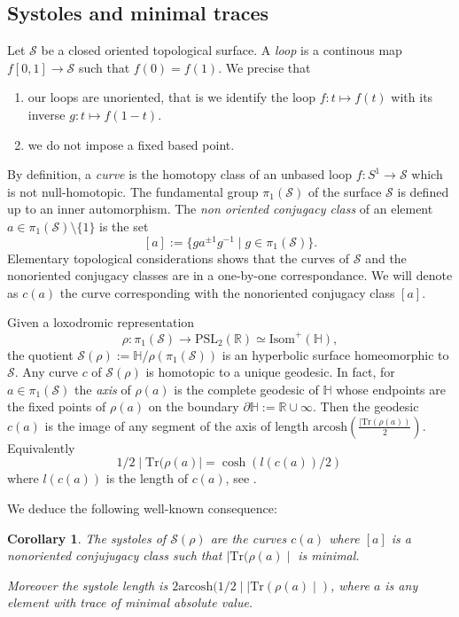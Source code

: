 \documentclass[12pt]{amsart}
\newcommand{\HP}{\mathbb{H}}
\newcommand{\R}{\mathbb{R}}
\newcommand{\arcosh}{\mathrm{arcosh}}
\newcommand{\Isom}{\mathrm{Isom}}
\newcommand{\PSL}{{\mathrm {PSL}}}
\newcommand{\Tr}{{\mathrm {Tr}}}
\newtheorem{cor}[lemma]{Corollary}
\newcommand{\cS}{\mathcal{S}}
\begin{document}
\subsection{Systoles and minimal traces}

Let $\cS$ be a closed oriented topological surface.
A {\it loop} is a continous map 
$f[0,1]\to{\cS}$ such that $f(0)=f(1)$.
We precise that
\begin{enumerate}
\item[(a)] our loops are unoriented, that is
we identify the loop
$f:t\mapsto f(t)$ with its inverse
$g: t\mapsto f(1-t)$. 
\item[(b)] we do not impose a fixed based point.
\end{enumerate}

By definition, a {\it curve} is the homotopy class
of an unbased loop $f:S^1\to {\cS}$ which is not null-homotopic.
The fundamental group $\pi_1(\cS)$  of the surface 
$\cS$ is defined up to an inner automorphism. The {\it non oriented conjugacy class}
of an element $a\in \pi_1(\cS)\setminus\{1\}$ is the set
$$[a]:=\{ga^{\pm 1}g^{-1}\mid g\in \pi_1(\cS)\}.$$
Elementary topological considerations shows
that the curves of $\cS$ and the nonoriented conjugacy classes are in a one-by-one correspondance. We will
denote as $c(a)$ the curve corresponding with the nonoriented conjugacy class $[a]$.

Given a loxodromic representation
$$\rho:\pi_1(\cS)\to\PSL_2(\R)\simeq \Isom^+(\HP),$$
the quotient $\cS(\rho):= \HP/\rho(\pi_1(\cS))$ is an hyperbolic surface homeomorphic to
$\cS$. Any curve $c$ of $\cS(\rho)$
is homotopic to a unique geodesic. 
In fact, for  $a\in \pi_1(\cS)$ the {\it axis}  of $\rho(a)$ is the complete geodesic of $\HP$  whose  endpoints are the fixed points of  
$\rho(a)$ on the boundary $\partial \HP:=\R\cup{\infty}$.
Then the geodesic $c(a)$ 
is the image  of any segment of the axis of length
$\arcosh(\frac{\mid\Tr(\rho(a))}{2})$.  Equivalently
$$1/2\mid \Tr(\rho(a)\mid=\cosh(l(c(a))/2)\,$$
where $l(c(a))$ is the length of  $c(a)$, see
\cite{Buser}.
 
\noindent We deduce the 
following well-known consequence:


\begin{cor}\label{mintrace} The systoles of $\cS(\rho)$ are the curves $c(a)$ where $[a]$ is a nonoriented conjujugacy class such that $\mid \Tr(\rho(a)\mid$ is minimal.

Moreover the systole length is 
$2\arcosh(1/2\mid \mid\Tr(\rho(a)\mid)$, where $a$ is any element with  trace of minimal absolute value.
\end{cor}
\end{document}
